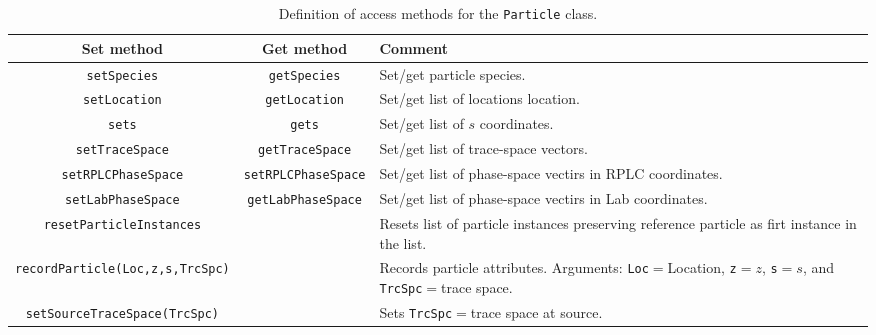 \begin{sidewaystable}[h]
  \caption{
    Definition of access methods for the \texttt{Particle}
    class. 
  }
  \label{Tab:P:AccessMethods}
  \begin{center}
    \begin{tabular}{|c|c|p{9cm}|}
      \hline
      \textbf{Set method} & \textbf{Get method}  & \textbf{Comment}                                                      \\
      \hline
      \texttt{setSpecies}        & \texttt{getSpecies}        & Set/get particle species.                                \\
      \texttt{setLocation}       & \texttt{getLocation}       & Set/get list of locations location.                      \\
      \texttt{sets}              & \texttt{gets}              & Set/get list of $s$ coordinates.                         \\
      \texttt{setTraceSpace}     & \texttt{getTraceSpace}     & Set/get list of trace-space vectors.                     \\
      \texttt{setRPLCPhaseSpace} & \texttt{setRPLCPhaseSpace} & Set/get list of phase-space vectirs in RPLC coordinates. \\
      \texttt{setLabPhaseSpace}  & \texttt{getLabPhaseSpace}  & Set/get list of phase-space vectirs in Lab coordinates.  \\
      \texttt{resetParticleInstances} &                       & Resets list of particle instances preserving reference
                                                                particle as firt instance in the list.                   \\
      \texttt{recordParticle(Loc,z,s,TrcSpc)} &            & Records particle attributes.  Arguments: \texttt{Loc}$=$Location,
                                                                \texttt{z}$=z$, \texttt{s}$=s$, and
                                                                \texttt{TrcSpc}$=$trace space.                           \\
      \texttt{setSourceTraceSpace(TrcSpc)} &               & Sets \texttt{TrcSpc}$=$trace space at source.               \\
      \hline
    \end{tabular}
  \end{center}
\end{sidewaystable}

